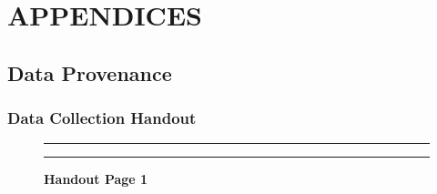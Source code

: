 \documentclass[]{article}
\begin{document}
\newpage
\section{APPENDICES}
\label{sec:appendix}

\subsection{Data Provenance}
\label{sec:appendix-data-provenance}

\newpage
\subsubsection{Data Collection Handout}
\label{sec:appendix-data-handout}

\begin{figure}[!ht]
    \hrule
    \caption{ \textbf{Handout Page 1} }
    \begin{center}
    \end{center}
    \label{fig:handout-1}
    \hrule
\end{figure}

\newpage
\end{document}
